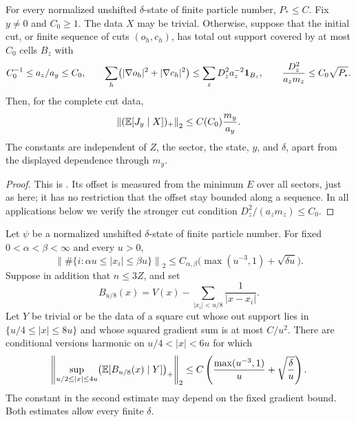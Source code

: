\begin{lemma}\label{lem:local-field-input}
For every normalized unshifted $\delta$-state of finite particle number,
$P_*\le C$.  Fix $y\ne0$ and $C_0\ge1$.  The data $X$ may be trivial.
Otherwise, suppose that the initial cut, or finite sequence of cuts
$(o_h,c_h)$, has total out support covered by at most $C_0$ cells $B_z$ with
\[
 C_0^{-1}\le a_z/a_y\le C_0,
 \qquad
 \sum_h\bigl(|\nabla o_h|^2+|\nabla c_h|^2\bigr)
       \le\sum_z D_z^2a_z^{-2}\mathbf 1_{B_z},
 \qquad
 \frac{D_z^2}{a_zm_z}\le C_0\sqrt{P_*}.
\]
Then, for the complete cut data,
\begin{equation}\label{eq:local-field-input}
 \left\|(\mathbb E[J_y\mid X])_+\right\|_2
       \le C(C_0)\frac{m_y}{a_y}.
\end{equation}
The constants are independent of $Z$, the sector, the state, $y$, and
$\delta$, apart from the displayed dependence through $m_y$.
\end{lemma}

\begin{proof}
This is \cite[\FLocalField]{Foundation}.  Its offset is measured from the
minimum $E$ over all sectors, just as here; it has no restriction that the
offset stay bounded along a sequence.  In all applications below we verify
the stronger cut condition $D_z^2/(a_zm_z)\le C_0$.
\end{proof}

\begin{lemma}\label{lem:screening-inputs}
Let $\psi$ be a normalized unshifted $\delta$-state of finite particle number.
For fixed $0<\alpha<\beta<\infty$ and every $u>0$,
\begin{equation}\label{eq:annular-count}
 \left\|\#\{i:\alpha u\le|x_i|\le\beta u\}\right\|_2
   \le C_{\alpha,\beta}
           \bigl(\max(u^{-3},1)+\sqrt{\delta u}\bigr).
\end{equation}
Suppose in addition that $n\le3Z$, and set
\[
 B_{u/8}(x)=V(x)-\sum_{|x_i|<u/8}\frac1{|x-x_i|}.
\]
Let $Y$ be trivial or be the data of a square cut whose out support lies in
$\{u/4\le|x|\le8u\}$ and whose squared gradient sum is at most $C/u^2$.
There are conditional versions harmonic on $u/4<|x|<6u$ for which
\begin{equation}\label{eq:conditional-inner-field}
 \left\|\sup_{u/2\le|x|\le4u}
              \bigl(\mathbb E[B_{u/8}(x)\mid Y]\bigr)_+\right\|_2
 \le C\left(\frac{\max(u^{-3},1)}u+\sqrt{\frac\delta u}\right).
\end{equation}
The constant in the second estimate may depend on the fixed gradient bound.
Both estimates allow every finite $\delta$.
\end{lemma}

